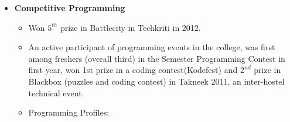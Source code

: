 \documentclass[margin,line]{resume}
\begin{document}
\begin{resume}
\begin{itemize}
  \item  \textbf{\textsf Competitive Programming}
    \begin{itemize}
    \item Won $5^{th}$ prize in Battlecity in Techkriti in 2012.
    \item An active participant of programming events in the college, was first among freshers (overall third) in the Semester Programming Contest in first year, won 1st prize in a coding contest(Kodefest) and $2^{nd}$ prize in Blackbox (puzzles and coding contest) in Takneek 2011, an inter-hostel technical event.
    \item Programming Profiles:       
    \end{itemize}

  \end{itemize}



\end{resume}
\end{document}
